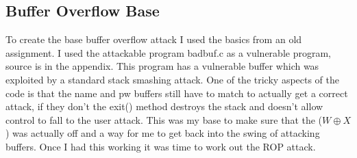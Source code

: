 \documentclass[11pt]{amsart}
\begin{document}
\subsection*{Buffer Overflow Base}
To create the base buffer overflow attack I used the basics from an old assignment. I used the attackable program badbuf.c as a vulnerable program, source is in the appendix. This program has a vulnerable buffer which was exploited by a standard stack smashing attack. One of the tricky aspects of the code is that the name and pw buffers still have to match to actually get a correct attack, if they don’t the exit() method destroys the stack and doesn't allow control to fall to the user attack. This was my base to make sure that the ($W \oplus X$) was actually off and a way for me to get back into the swing of attacking buffers. Once I had this working it was time to work out the ROP attack.
\end{document}
